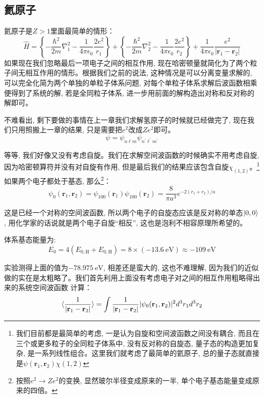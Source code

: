 \subsection*{氦原子}
氦原子是$Z>1$里面最简单的情形：
\begin{equation}
    \hat{H}=\left\{-\frac{\hbar^{2}}{2 m} \nabla_{1}^{2}-\frac{1}{4 \pi \epsilon_{0}} \frac{2 e^{2}}{r_{1}}\right\}+\left\{-\frac{\hbar^{2}}{2 m} \nabla_{2}^{2}-\frac{1}{4 \pi \epsilon_{0}} \frac{2 e^{2}}{r_{2}}\right\}+\frac{1}{4 \pi \epsilon_{0}} \frac{e^{2}}{\left|\mathbf{r}_{1}-\mathbf{r}_{2}\right|}
\end{equation}
如果现在我们忽略最后一项电子之间的相互作用, 现在哈密顿量就简化为了两个粒子间无相互作用的情形。根据我们之前的说法, 这种情况是可以分离变量求解的, 可以完全化简为两个单独的单粒子体系问题, 
对每个单粒子体系求解后波函数相乘便得到了系统的解, 若是全同粒子体系, 进一步用前面的解构造出对称和反对称的解即可。

不难看出, 剩下要做的事情在上一章我们求解氢原子的时候就已经做完了, 现在我们只用照搬上一章的结果, 只是需要把$e^2$改成$Ze^2$即可。
\[\psi=\psi_{n\ell m}\psi_{n^\prime\ell^\prime m^\prime}\]

等等, 我们好像又没有考虑自旋。我们在求解空间波函数的时候确实不用考虑自旋, 因为哈密顿算符并没有对自旋有作用, 但是最后我们的结果应该包含自旋$\chi_(1,2)$。\footnote{我们目前都是最简单的考虑, 一是认为自旋和空间波函数之间没有耦合, 而且在三个或更多粒子的全同粒子体系中, 没有反对称的自旋态, 量子态的构造更加复杂, 是一系列线性组合。这里我们就考虑了最简单的氦原子, 总的量子态就直接是$\psi(\mathbf{r}_1,\mathbf{r}_2)\chi(1,2)$}
如果两个电子都处于基态, 那么\footnote{按照$e^2\rightarrow Ze^2$的变换, 显然玻尔半径变成原来的一半, 单个电子基态能量变成原来的四倍。}：
\[\psi_{0}\left(\mathbf{r}_{1}, \mathbf{r}_{2}\right)=\psi_{100}\left(\mathbf{r}_{1}\right) \psi_{100}\left(\mathbf{r}_{2}\right)=\frac{8}{\pi a^{3}} e^{-2\left(r_{1}+r_{2}\right) / a}\]

这是已经一个对称的空间波函数, 所以两个电子的自旋态应该是反对称的单态$\ket{0,0}$, 用化学家的话说就是两个电子自旋“相反”, 这也是泡利不相容原理所希望的。

体系基态能量为:
\[E_0=4(E_{0,\mathrm{H}}+E_{0,\mathrm{H}})=8\times(\SI{-13.6}{\eV})\approx\SI{-109}{\eV}\]

实验测得上面的值为$\SI{-78.975}{\eV}$, 相差还是蛮大的, 这也不难理解, 因为我们的近似做的实在是太粗略了。我们首先利用上面没有考虑电子对之间的相互作用粗略得出来的系统空间波函数
计算：
\begin{equation}
    \braket{\frac{1}{\left|\mathbf{r}_1-\mathbf{r}_2\right|}}=\int\frac{1}{|\mathbf{r}_1-\mathbf{r}_2|}|\psi_0(\mathbf{r}_1,\mathbf{r}_2)|^2d^3r_1d^3r_2
\end{equation}

